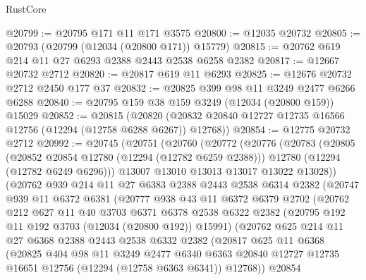 \begin{lexlean}{RustCore}
\begin{coremodule}
@20799 := @20795 @171 @11 @171 @3575
@20800 := @12035 @20732
@20805 := @20793 (@20799 (@12034 (@20800 @171)) @15779)
@20815 := @20762 @619 @214 @11 @27 @6293 @2388 @2443 @2538 @6258 @2382
@20817 := @12667 @20732 @2712
@20820 := @20817 @619 @11 @6293
@20825 := @12676 @20732 @2712 @2450 @177 @37
@20832 := @20825 @399 @98 @11 @3249 @2477 @6266 @6288
@20840 := @20795 @159 @38 @159 @3249 (@12034 (@20800 @159)) @15029
@20852 := @20815
    (@20820 (@20832 @20840 @12727 @12735 @16566 @12756 (@12294 (@12758 @6288 @6267)) @12768))
@20854 := @12775 @20732 @2712
@20992 := @20745
    (@20751
      (@20760
        (@20772
          (@20776
            (@20783
              (@20805
                (@20852 @20854 @12780 (@12294 (@12782 @6259 @2388)))
                @12780
                (@12294 (@12782 @6249 @6296)))
              @13007
              @13010
              @13013
              @13017
              @13022
              @13028))
          (@20762
            @939
            @214
            @11
            @27
            @6383
            @2388
            @2443
            @2538
            @6314
            @2382
            (@20747
              @939
              @11
              @6372
              @6381
              (@20777
                @938
                @43
                @11
                @6372
                @6379
                @2702
                (@20762
                  @212
                  @627
                  @11
                  @40
                  @3703
                  @6371
                  @6378
                  @2538
                  @6322
                  @2382
                  (@20795 @192 @11 @192 @3703 (@12034 (@20800 @192)) @15991)
                  (@20762
                    @625
                    @214
                    @11
                    @27
                    @6368
                    @2388
                    @2443
                    @2538
                    @6332
                    @2382
                    (@20817
                      @625
                      @11
                      @6368
                      (@20825
                        @404
                        @98
                        @11
                        @3249
                        @2477
                        @6340
                        @6363
                        @20840
                        @12727
                        @12735
                        @16651
                        @12756
                        (@12294 (@12758 @6363 @6341))
                        @12768))
                    @20854

\end{coremodule}
\end{lexlean}
